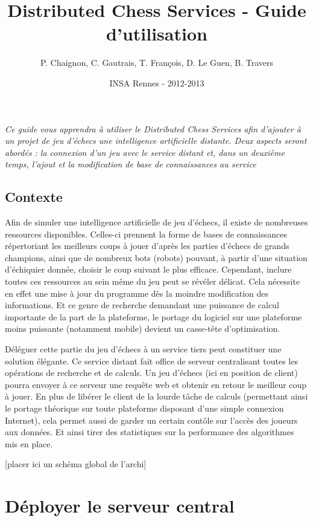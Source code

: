 \documentclass[a4paper,11pt]{report}
\title{Distributed Chess Services - Guide d'utilisation}
\author{P. Chaignon, C. Gautrais, T. François, D. Le Guen, B. Travers}
\date{INSA Rennes - 2012-2013}
\begin{document}
\maketitle{}

{\em Ce guide vous apprendra à utiliser le Distributed Chess Services afin d'ajouter à un projet de jeu d'échecs une intelligence artificielle distante. Deux aspects seront abordés : la connexion d'un jeu avec le service distant et, dans un deuxième temps, l'ajout et la modification de base de connaissances au service}


\section*{Contexte}
        Afin de simuler une intelligence artificielle de jeu d'échecs, il existe de nombreuses ressources disponibles. Celles-ci prennent la forme de bases de connaissances répertoriant les meilleurs coups à jouer d'après les parties d'échecs de grands champions, ainsi que de nombreux bots (robots) pouvant, à partir d'une situation d'échiquier donnée, choisir le coup suivant le plus efficace. Cependant, inclure toutes ces ressources au sein même du jeu peut se révéler délicat. Cela nécessite en effet une mise à jour du programme dès la moindre modification des informations. Et ce genre de recherche demandant une puissance de calcul importante de la part de la plateforme, le portage du logiciel sur une plateforme moins puissante (notamment mobile) devient un casse-tête d'optimisation.
        
        Déléguer cette partie du jeu d'échecs à un service tiers peut constituer une solution élégante. Ce service distant fait office de serveur centralisant toutes les opérations de recherche et de calculs. Un jeu d'échecs (ici en position de client) pourra envoyer à ce serveur une requête web et obtenir en retour le meilleur coup à jouer. En plus de libérer le client de la lourde tâche de calculs (permettant ainsi le portage théorique sur toute plateforme disposant d'une simple connexion Internet), cela permet aussi de garder un certain contôle sur l'accès des joueurs aux données. Et ainsi tirer des statistiques sur la performance des algorithmes mis en place.


[placer ici un schéma global de l’archi]


\chapter{Déployer le serveur central}
\end{document}

